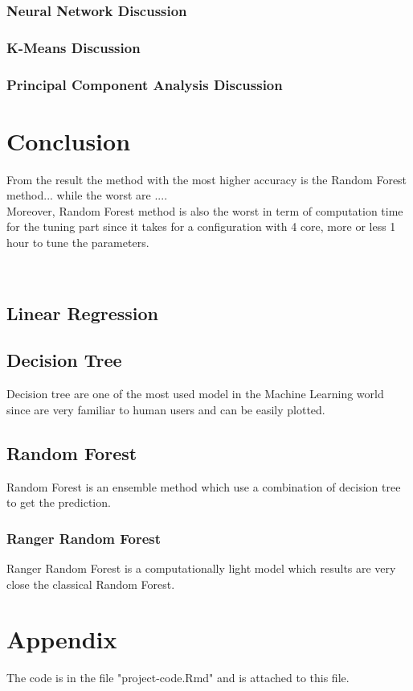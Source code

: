 \documentclass{FR16}
\begin{document}
\subsubsection{Neural Network Discussion}
\subsubsection{K-Means Discussion}
\subsubsection{Principal Component Analysis Discussion}

\section{Conclusion}

From the result the method with the most higher accuracy is the Random Forest method... while the worst are ....
\\Moreover, Random Forest method is also the worst in term of computation time for the tuning part since it takes for a configuration with 4 core, more or less 1 hour to tune the parameters. 

\
\subsection{Linear Regression}


\subsection{Decision Tree}
Decision  tree are one of the most used model in the Machine Learning world since are very familiar to human users and can be easily plotted. 
\\



\subsection{Random Forest}
Random Forest is an ensemble method which use a combination of decision tree to get the prediction.
\subsubsection{Ranger Random Forest}
Ranger Random Forest is a computationally light model which results are very close the classical Random Forest.
\\





\newpage
\section{Appendix}
%
The code is in the file "project-code.Rmd" and is attached to this file.

%
\end{document}
